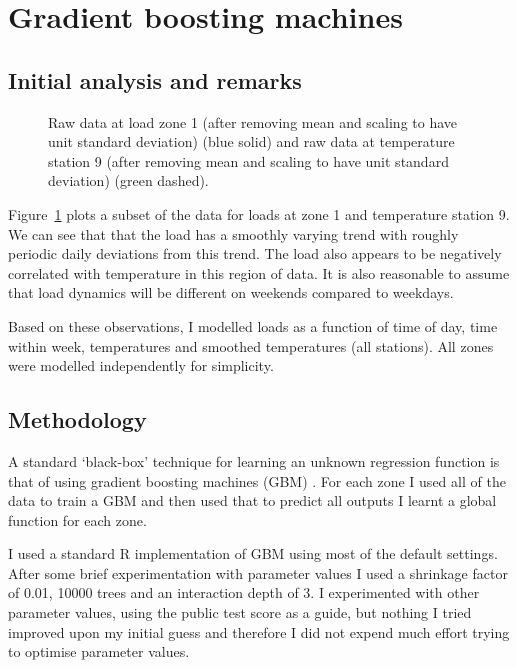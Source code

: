 \section{Gradient boosting machines}

\label{sec:gbm}

\subsection{Initial analysis and remarks}

\label{sec:gbm_init_anal}

\begin{figure}[ht]
  \begin{center}
    
  \end{center}
  \caption{Raw data at load zone 1 (after removing mean and scaling to have unit standard deviation) (blue solid) and raw data at temperature station 9 (after removing mean and scaling to have unit standard deviation) (green dashed).}
  \label{fig:load_temp}
\end{figure}

Figure~\ref{fig:load_temp} plots a subset of the data for loads at zone 1 and temperature station 9.
We can see that that the load has a smoothly varying trend with roughly periodic daily deviations from this trend.
The load also appears to be negatively correlated with temperature in this region of data.
It is also reasonable to assume that load dynamics will be different on weekends compared to weekdays.

Based on these observations, I modelled loads as a function of time of day, time within week, temperatures and smoothed temperatures (all stations).
All zones were modelled independently for simplicity.

\subsection{Methodology}

A standard `black-box' technique for learning an unknown regression function is that of using gradient boosting machines (GBM) \citep[e.g. chapter 10 of][]{Hastie2009-hj}.
For each zone I used all of the data to train a GBM and then used that to predict all outputs \ie I learnt a global function for each zone.

I used a standard R implementation of GBM using most of the default settings\footnotemark.
After some brief experimentation with parameter values I used a shrinkage factor of 0.01, 10000 trees and an interaction depth of 3.
I experimented with other parameter values, using the public test score as a guide, but nothing I tried improved upon my initial guess and therefore I did not expend much effort trying to optimise parameter values.

